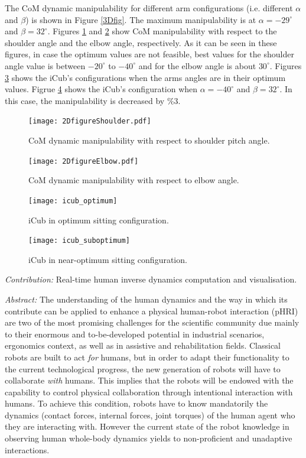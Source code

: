 The CoM dynamic manipulability for different arm configurations
(i.e. different $\alpha$ and $\beta$) is shown in Figure \ref{3Dfig}.  The
maximum manipulability is at $\alpha = -29^\circ$ and $\beta = 32^\circ$.
Figures \ref{2Dfig_shoulder} and \ref{2Dfig_elbow} show CoM manipulability
with respect to the shoulder angle and the elbow angle, respectively.  As it
can be seen in these figures, in case the optimum values are not feasible,
best values for the shoulder angle value is between $-20^\circ$ to $-40^\circ$
and for the elbow angle is about $30^\circ$.  Figures \ref{icub_optimum} shows
the iCub's configurations when the arms angles are in their optimum values.
Figrue \ref{icub_suboptimum} shows the iCub's configuration when $\alpha =
-40^\circ$ and $\beta = 32^\circ$.  In this case, the manipulability is
decreased by $\%3$.
%
\begin{figure}
  \centering \texttt{[image: 2DfigureShoulder.pdf]}
  \caption{CoM dynamic manipulability with respect to shoulder pitch angle.}
  \label{2Dfig_shoulder}
\end{figure}
%
\begin{figure}
  \centering
  \texttt{[image: 2DfigureElbow.pdf]}
  \caption{CoM dynamic manipulability with respect to elbow angle.}
  \label{2Dfig_elbow}
\end{figure}
%
\begin{figure}
  \centering \texttt{[image: icub\_optimum]}
  \caption{iCub in optimum sitting configuration.}
  \label{icub_optimum}
\end{figure}
%
\begin{figure}
  \centering
  \texttt{[image: icub\_suboptimum]}
  \caption{iCub in near-optimum sitting configuration.}
  \label{icub_suboptimum}
\end{figure}
%

\emph{Contribution:} Real-time human inverse dynamics computation and visualisation.

\emph{Abstract:} The understanding of the human dynamics and the way in which its contribute can 
be applied to enhance a physical human-robot interaction (pHRI) are two of the 
most promising challenges for the scientific community due mainly to their 
enormous and to-be-developed potential in industrial scenarios, ergonomics 
context, as well as in assistive and rehabilitation fields. 
Classical robots are built to act \emph{for} humans, but in order to adapt 
their functionality to the current technological progress, the new generation 
of robots will have to collaborate \emph{with} humans.  This implies that the 
robots will be endowed with the capability to control physical collaboration 
through intentional interaction with humans.
To achieve this condition, robots have to know mandatorily the dynamics 
(contact forces, internal forces, joint torques) of the human agent who 
they are interacting with.  However the current state of the robot knowledge 
in observing human whole-body dynamics  yields to non-proficient and unadaptive 
interactions.


